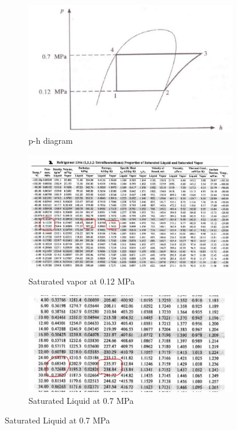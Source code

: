 \documentclass{article}
\begin{document}
\begin{figure}
  \centering
  
  \begin{subfigure}{0.45\textwidth}
      \includegraphics[width=\textwidth]{img/prb-01.jpeg}
      \caption{p-h diagram}
      \label{subfig:p-h diagram}
  \end{subfigure}
  \hfill
  \begin{subfigure}{0.95\textwidth}
      \includegraphics[width=\textwidth]{img/prb-01a.jpeg}
      \caption{Saturated vapor at 0.12 MPa}
      \label{subfig:Saturated vapor at 0.12 MPa}
  \end{subfigure}
  
  \vspace{1cm}
  
  \begin{subfigure}{0.95\textwidth}
      \includegraphics[width=\textwidth]{img/prb-01b.jpeg}
      \caption{Saturated Liquid at 0.7 MPa}
      \label{subfig:Saturated Liquid at 0.7 MPa}
  \end{subfigure}


\end{figure}
\end{document}
